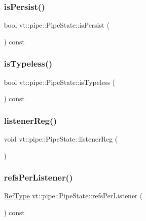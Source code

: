 \subsubsection{\texorpdfstring{is\+Persist()}{isPersist()}}
{\footnotesize\ttfamily bool vt\+::pipe\+::\+Pipe\+State\+::is\+Persist (\begin{DoxyParamCaption}{ }\end{DoxyParamCaption}) const}

\mbox{\label{structvt_1_1pipe_1_1_pipe_state_a0e20b860728e1aded738be02074c5861}} 
\subsubsection{\texorpdfstring{is\+Typeless()}{isTypeless()}}
{\footnotesize\ttfamily bool vt\+::pipe\+::\+Pipe\+State\+::is\+Typeless (\begin{DoxyParamCaption}{ }\end{DoxyParamCaption}) const}

\mbox{\label{structvt_1_1pipe_1_1_pipe_state_acfbe1dc3cac73153543a394b4f8add35}} 
\subsubsection{\texorpdfstring{listener\+Reg()}{listenerReg()}}
{\footnotesize\ttfamily void vt\+::pipe\+::\+Pipe\+State\+::listener\+Reg (\begin{DoxyParamCaption}{ }\end{DoxyParamCaption})}

\mbox{\label{structvt_1_1pipe_1_1_pipe_state_a4e0c0ff9eebf70c05e283474fdbdeb14}} 
\subsubsection{\texorpdfstring{refs\+Per\+Listener()}{refsPerListener()}}
{\footnotesize\ttfamily \hyperlink{namespacevt_a9b39ce9494bb04674d0d5b895a5aa50f}{Ref\+Type} vt\+::pipe\+::\+Pipe\+State\+::refs\+Per\+Listener (\begin{DoxyParamCaption}{ }\end{DoxyParamCaption}) const}

